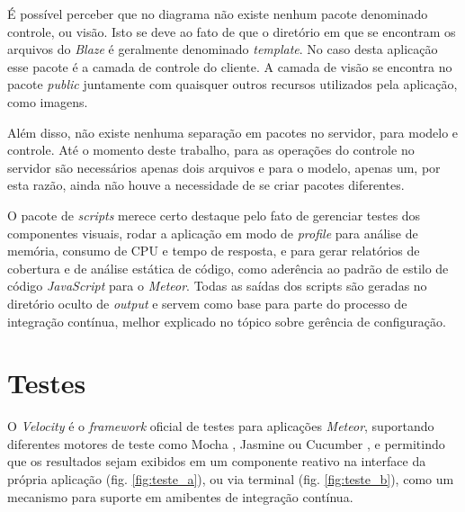 É possível perceber que no diagrama não existe nenhum pacote denominado controle, ou visão. Isto se deve ao fato de que o diretório em que se encontram os arquivos do \textit{Blaze} é geralmente denominado \textit{template}. No caso desta aplicação esse pacote é a camada de controle do cliente. A camada de visão se encontra no pacote \textit{public} juntamente com quaisquer outros recursos utilizados pela aplicação, como imagens.

Além disso, não existe nenhuma separação em pacotes no servidor, para modelo e controle. Até o momento deste trabalho, para as operações do controle no servidor são necessários apenas dois arquivos e para o modelo, apenas um, por esta razão, ainda não houve a necessidade de se criar pacotes diferentes.

O pacote de \textit{scripts} merece certo destaque pelo fato de gerenciar testes dos componentes visuais, rodar a aplicação em modo de \textit{profile} para análise de memória, consumo de CPU e tempo de resposta, e para gerar relatórios de cobertura e de análise estática de código, como aderência ao padrão de estilo de código \textit{JavaScript} para o \textit{Meteor}. Todas as saídas dos scripts são geradas no diretório oculto de \textit{output} e servem como base para parte do processo de integração contínua, melhor explicado no tópico sobre gerência de configuração. 


\section{Testes}

O \textit{Velocity} é o \textit{framework} oficial de testes para aplicações \textit{Meteor}, suportando diferentes motores de teste como Mocha \cite{mocha2015}, Jasmine \cite{jasmine2015} ou Cucumber \cite{cucumber2015}, e permitindo que os resultados sejam exibidos em um componente reativo na interface da própria aplicação (fig. \ref{fig:teste_a}), ou via terminal (fig. \ref{fig:teste_b}), como um mecanismo para suporte em amibentes de integração contínua.

